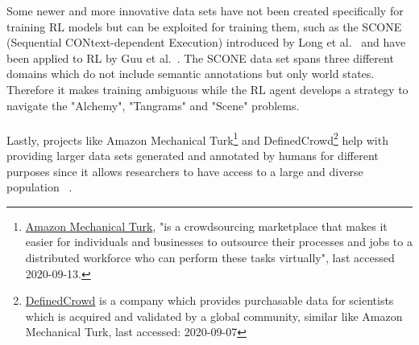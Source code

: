\documentclass[11pt]{article}
\begin{document}
Some newer and more innovative data sets have not been created specifically for training RL models but can be exploited for training them, such as the SCONE (Sequential CONtext-dependent Execution) introduced by Long et al.~ and have been applied to RL by Guu et al.~. The SCONE data set spans three different domains which do not include semantic annotations but only world states. Therefore it makes training ambiguous while the RL agent develops a strategy to navigate the "Alchemy", "Tangrams" and "Scene" problems.\\\\
Lastly, projects like Amazon Mechanical Turk\footnote{\hyperlink{https://www.mturk.com/}{Amazon Mechanical Turk}, "is a crowdsourcing marketplace that makes it easier for individuals and businesses to outsource their processes and jobs to a distributed workforce who can perform these tasks virtually", last accessed 2020-09-13.} and DefinedCrowd\footnote{\hyperlink{https://www.definedcrowd.com/}{DefinedCrowd} is a company which provides purchasable data for scientists which is acquired and validated by a global community, similar like Amazon Mechanical Turk, last accessed: 2020-09-07} help with providing larger data sets generated and annotated by humans for different purposes since it allows researchers to have access to a large and diverse population ~\cite{AMTurk-2012}. 
\end{document}
